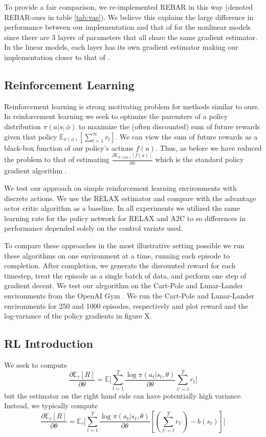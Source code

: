 \documentclass{article}
\newcommand{\E}{\mathbb{E}}
\newcommand{\LL}[1]{\frac{\log \pi(a_{#1}| s_{#1}, \theta)}{\partial \theta}}
\begin{document}
To provide a fair comparison, we re-implemented REBAR in this way (denoted REBAR-ours in table \ref{tab:vae}).
We believe this explains the large difference in performance between our implementation and that of \citep{tucker2017rebar} for the nonlinear models since there are 3 layers of parameters that all share the same gradient estimator.
In the linear models, each layer has its own gradient estimator making our implementation closer to that of \citep{tucker2017rebar}.



\subsection{Reinforcement Learning}
Reinforcement learning is strong motivating problem for methods similar to ours. In reinforcement learning we seek to optimize the paremters of a policy distribution $\pi(a|s;\phi)$ to maximize the (often discounted) sum of future rewards given that policy $\mathbb{E}_{\pi(\phi)}[\sum_{t=1}^{\infty} r_t]$. We can view the sum of future rewards as a black-box function of our policy's actions $f(a)$. Thus, as before we have reduced the problem to that of estimating $\frac{\partial \mathbb{E}_{\pi(a|\phi)}[f(a)]}{\partial \phi}$ which is the standard policy gradient algorithm \cite{sutton2000policy}. 

We test our approach on simple reinforcement learning environments with discrete actions. We use the RELAX estimator and compare with the advantage actor critic algorithm \cite{sutton2000policy} as a baseline. In all experiments we utilized the same learning rate for the policy network for RELAX and A2C to so differences in performance depended solely on the control variate used. 

To compare these approaches in the most illustrative setting possible we run these algorithms on one environment at a time, running each episode to completion. After completion, we generate the discounted reward for each timestep, treat the episode as a single batch of data, and perform one step of gradient decent. We test our alrgorithm on the Cart-Pole and Lunar-Lander environments from the OpenAI Gym \cite{1606.01540}. We run the Cart-Pole and Lunar-Lander environments for 250 and 1000 episodes, respectively and plot reward and the log-variance of the policy gradients in figure X.

\subsection{RL Introduction}
We seek to compute $$\frac{\partial \E_\tau[R]}{\partial \theta} = \E\Big[\sum_{t=1}^T \LL{t} \sum_{t'=t}^T r_t\Big]$$ but the estimator on the right hand side can have potentially high variance. Instead, we typically compute $$\frac{\partial \E_\tau[R]}{\partial \theta} = \E_\tau\Big[\sum_{t=1}^T \LL{t} [(\sum_{t'=t}^T r_{t'}) - b(s_t)]\Big]$$
\end{document}

